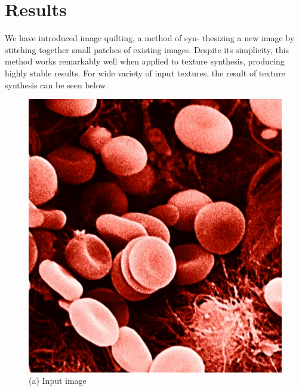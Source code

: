 \documentclass[12pt,a4paper]{report}
\begin{document}
\section{Results}
We have introduced image quilting, a method of syn-
thesizing a new image by stitching together small patches of existing images. Despite its simplicity, this method works remarkably well when applied to texture synthesis, producing highly stable results. For wide variety of input textures, the result of texture synthesis can be seen below.
\newline
\begin{figure}[H]
  \centering
  \centering
  \includegraphics[scale=0.22]{pics/rbc_input.jpg}
  \caption{(a) Input image}
  \label{fig:rbc}
  \endminipage
  \centering

\end{figure}
\end{document}
